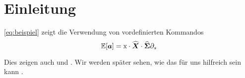 \chapter{Einleitung}
\label{ch:Enleitung}

\eqref{eq:beispiel} zeigt die Verwendung von vordefinierten Kommandos
\begin{equation}
	\label{eq:beispiel}
	\operatorname{\mathbb{E}} [\boldsymbol{a}] = \textnormal{x} \cdot \widehat{\boldsymbol{X}} \cdot \widehat{\boldsymbol{\Sigma}}
	\partial_s
\end{equation}

Dies zeigen auch \textcite[vgl.][100 -- 232]{Maaten.2009} und \textcite[100 -- 232]{Goodfellow.2016}. Wir werden später sehen, wie das für uns hilfreich sein kann \citep[vgl.][234 -- 239]{Goodfellow.2016}.